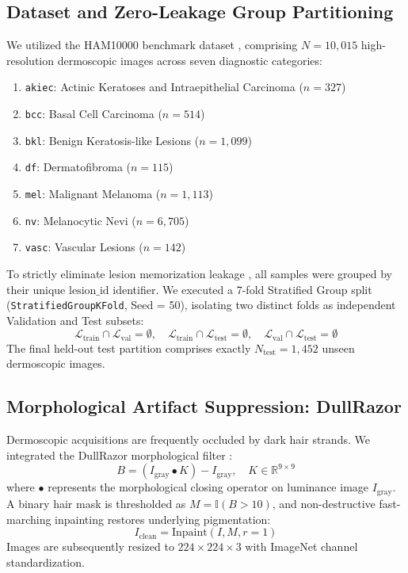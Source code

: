 \documentclass[journal,10pt,twocolumn]{IEEEtran}
\begin{document}
\subsection{Dataset and Zero-Leakage Group Partitioning}
We utilized the HAM10000 benchmark dataset \cite{tschandl2018ham10000}, comprising $N = 10,015$ high-resolution dermoscopic images across seven diagnostic categories:
\begin{enumerate}
    \item \texttt{akiec}: Actinic Keratoses and Intraepithelial Carcinoma ($n=327$)
    \item \texttt{bcc}: Basal Cell Carcinoma ($n=514$)
    \item \texttt{bkl}: Benign Keratosis-like Lesions ($n=1,099$)
    \item \texttt{df}: Dermatofibroma ($n=115$)
    \item \texttt{mel}: Malignant Melanoma ($n=1,113$)
    \item \texttt{nv}: Melanocytic Nevi ($n=6,705$)
    \item \texttt{vasc}: Vascular Lesions ($n=142$)
\end{enumerate}

To strictly eliminate lesion memorization leakage \cite{cassidy2022analysis}, all samples were grouped by their unique $\text{lesion\_id}$ identifier. We executed a 7-fold Stratified Group split (\texttt{StratifiedGroupKFold}, Seed = 50), isolating two distinct folds as independent Validation and Test subsets:
\begin{equation}
\mathcal{L}_{\text{train}} \cap \mathcal{L}_{\text{val}} = \emptyset, \quad \mathcal{L}_{\text{train}} \cap \mathcal{L}_{\text{test}} = \emptyset, \quad \mathcal{L}_{\text{val}} \cap \mathcal{L}_{\text{test}} = \emptyset
\end{equation}
The final held-out test partition comprises exactly $N_{\text{test}} = 1,452$ unseen dermoscopic images.

\subsection{Morphological Artifact Suppression: DullRazor}
Dermoscopic acquisitions are frequently occluded by dark hair strands. We integrated the DullRazor morphological filter \cite{lee1997dullrazor}:
\begin{equation}
B = (I_{\text{gray}} \bullet K) - I_{\text{gray}}, \quad K \in \mathbb{R}^{9 \times 9}
\end{equation}
where $\bullet$ represents the morphological closing operator on luminance image $I_{\text{gray}}$. A binary hair mask is thresholded as $M = \mathbb{I}(B > 10)$, and non-destructive fast-marching inpainting \cite{lee1997dullrazor} restores underlying pigmentation:
\begin{equation}
I_{\text{clean}} = \text{Inpaint}(I, M, r=1)
\end{equation}
Images are subsequently resized to $224 \times 224 \times 3$ with ImageNet channel standardization.
\end{document}
